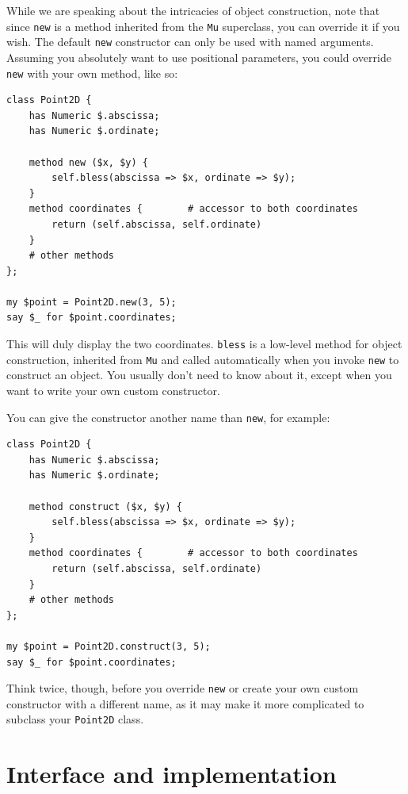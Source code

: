 While we are speaking about the intricacies of object 
construction, note that since {\tt new} is a method inherited 
from the {\tt Mu} superclass, you can override it if you wish. 
The default {\tt new} constructor can only be used with named 
arguments. Assuming you absolutely want to use positional parameters, you 
could override {\tt new} with your own method, like so:
 

\begin{verbatim}
class Point2D {
    has Numeric $.abscissa;
    has Numeric $.ordinate;

    method new ($x, $y) {
    	self.bless(abscissa => $x, ordinate => $y);
    }
    method coordinates {        # accessor to both coordinates
        return (self.abscissa, self.ordinate)
    }
    # other methods
};

my $point = Point2D.new(3, 5);
say $_ for $point.coordinates;
\end{verbatim}

This will duly display the two coordinates. {\tt bless} is a 
low-level method for object construction, inherited from 
{\tt Mu} and called automatically when you invoke 
{\tt new} to construct an object. You usually don't need 
to know about it, except when you want to write your own custom 
constructor.

You can give the constructor another name than {\tt new}, 
for example:

\begin{verbatim}
class Point2D {
    has Numeric $.abscissa;
    has Numeric $.ordinate;

    method construct ($x, $y) {
    	self.bless(abscissa => $x, ordinate => $y);
    }
    method coordinates {        # accessor to both coordinates
        return (self.abscissa, self.ordinate)
    }
    # other methods
};

my $point = Point2D.construct(3, 5);
say $_ for $point.coordinates;
\end{verbatim}

Think twice, though, before you override {\tt new} or create your 
own custom constructor with a different name, as it may make it 
more complicated to subclass your {\tt Point2D} class.



\section{Interface and implementation}

